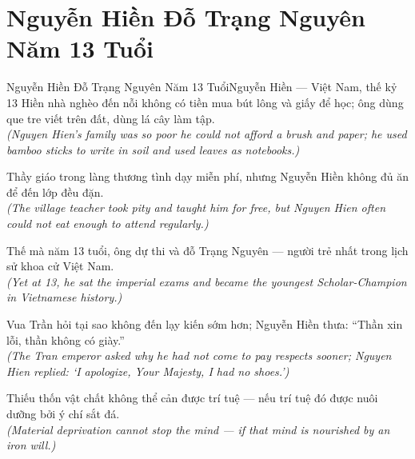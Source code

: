 \section{Nguyễn Hiền Đỗ Trạng Nguyên Năm 13 Tuổi}
\begin{truyen}{Nguyễn Hiền Đỗ Trạng Nguyên Năm 13 Tuổi}{Nguyễn Hiền --- Việt Nam, thế kỷ 13}
 Hiền nhà nghèo đến nỗi không có tiền mua bút lông và giấy để học; ông dùng que tre viết trên đất, dùng lá cây làm tập.\\[4pt]
\textit{(Nguyen Hien's family was so poor he could not afford a brush and paper; he used bamboo sticks to write in soil and used leaves as notebooks.)}

Thầy giáo trong làng thương tình dạy miễn phí, nhưng Nguyễn Hiền không đủ ăn để đến lớp đều đặn.\\[4pt]
\textit{(The village teacher took pity and taught him for free, but Nguyen Hien often could not eat enough to attend regularly.)}

Thế mà năm 13 tuổi, ông dự thi và đỗ Trạng Nguyên --- người trẻ nhất trong lịch sử khoa cử Việt Nam.\\[4pt]
\textit{(Yet at 13, he sat the imperial exams and became the youngest Scholar-Champion in Vietnamese history.)}

Vua Trần hỏi tại sao không đến lạy kiến sớm hơn; Nguyễn Hiền thưa: ``Thần xin lỗi, thần không có giày.''\\[4pt]
\textit{(The Tran emperor asked why he had not come to pay respects sooner; Nguyen Hien replied: `I apologize, Your Majesty, I had no shoes.')}

\end{truyen}
\begin{baihoc}
  Thiếu thốn vật chất không thể cản được trí tuệ --- nếu trí tuệ đó được nuôi dưỡng bởi ý chí sắt đá.\\[4pt]
  \textit{(Material deprivation cannot stop the mind --- if that mind is nourished by an iron will.)}
\end{baihoc}

